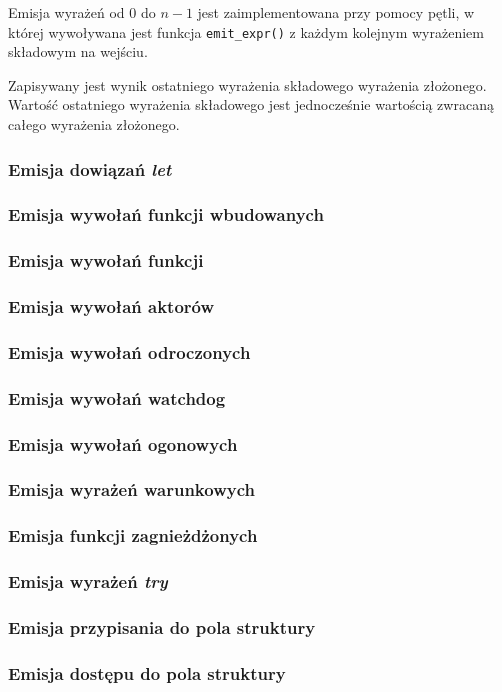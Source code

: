 Emisja wyrażeń od $0$ do $n-1$ jest zaimplementowana przy pomocy pętli, w której
wywoływana jest funkcja \texttt{emit\_expr()} z każdym kolejnym wyrażeniem
składowym na wejściu.

Zapisywany jest wynik ostatniego wyrażenia składowego wyrażenia złożonego.
Wartość ostatniego wyrażenia składowego jest jednocześnie wartością zwracaną
całego wyrażenia złożonego.

\subsubsection{Emisja dowiązań \emph{let}}



\subsubsection{Emisja wywołań funkcji wbudowanych}
\subsubsection{Emisja wywołań funkcji}
\subsubsection{Emisja wywołań aktorów}
\subsubsection{Emisja wywołań odroczonych}
\subsubsection{Emisja wywołań watchdog}
\subsubsection{Emisja wywołań ogonowych}
\subsubsection{Emisja wyrażeń warunkowych}
\subsubsection{Emisja funkcji zagnieżdżonych}
\subsubsection{Emisja wyrażeń \emph{try}}
\subsubsection{Emisja przypisania do pola struktury}
\subsubsection{Emisja dostępu do pola struktury}

